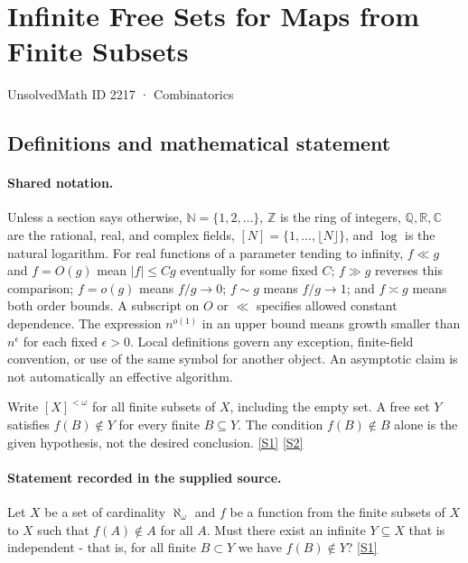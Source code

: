 \documentclass[11pt,a4paper]{article}
\newcommand{\N}{\mathbb{N}}
\newcommand{\Z}{\mathbb{Z}}
\newcommand{\Q}{\mathbb{Q}}
\newcommand{\R}{\mathbb{R}}
\newcommand{\C}{\mathbb{C}}
\newcommand{\sref}[2]{\hyperlink{source:#1:#2}{[S#2]}}
\begin{document}

\setcounter{section}{2216}

\section{Infinite Free Sets for Maps from Finite Subsets}\label{2217}

{\small\sffamily UnsolvedMath ID 2217 · Combinatorics}

\subsection{Definitions and mathematical statement}

\paragraph{Shared notation.}Unless a section says otherwise, $\N=\{1,2,\ldots\}$,
$\Z$ is the ring of integers, $\Q,\R,\C$ are the rational, real, and complex
fields, $[N]=\{1,\ldots,\lfloor N\rfloor\}$, and $\log$ is the natural
logarithm. For real functions of a parameter tending to infinity,
$f\ll g$ and $f=O(g)$ mean $|f|\leq Cg$ eventually for some fixed $C$;
$f\gg g$ reverses this comparison; $f=o(g)$ means $f/g\to0$;
$f\sim g$ means $f/g\to1$; and $f\asymp g$ means both order bounds.
A subscript on $O$ or $\ll$ specifies allowed constant dependence.
The expression $n^{o(1)}$ in an upper bound means growth smaller than
$n^\epsilon$ for each fixed $\epsilon>0$. Local definitions govern any
exception, finite-field convention, or use of the same symbol for another
object. An asymptotic claim is not automatically an effective algorithm.



Write $[X]^{<\omega}$ for all finite subsets of $X$, including the empty set. A free set $Y$ satisfies $f(B)\notin Y$ for every finite $B\subseteq Y$. The condition $f(B)\notin B$ alone is the given hypothesis, not the desired conclusion. \sref{2217}{1} \sref{2217}{2}

\paragraph{Statement recorded in the supplied source.}
Let $X$ be a set of cardinality $\aleph_\omega$ and $f$ be a function from the finite subsets of $X$ to $X$ such that $f(A)\not\in A$ for all $A$. Must there exist an infinite $Y\subseteq X$ that is independent - that is, for all finite $B\subset Y$ we have $f(B)\not\in Y$? \sref{2217}{1}
\end{document}

